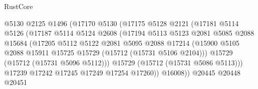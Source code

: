 \begin{lexlean}{RustCore}
\begin{coremodule}
                                    @5130
                                    @2125
                                    @1496
                                    (@17170
                                      @5130
                                      (@17175
                                        @5128
                                        @2121
                                        (@17181
                                          @5114
                                          @5126
                                          (@17187
                                            @5114
                                            @5124
                                            @2608
                                            (@17194
                                              @5113
                                              @5123
                                              @2081
                                              @5085
                                              @2088
                                              @15684
                                              (@17205
                                                @5112
                                                @5122
                                                @2081
                                                @5095
                                                @2088
                                                @17214
                                                (@15900
                                                  @5105
                                                  @2088
                                                  @15911
                                                  @15725
                                                  @15729
                                                  (@15712 (@15731 @5106 @2104)))
                                                @15729
                                                (@15712 (@15731 @5096 @5112)))
                                              @15729
                                              (@15712 (@15731 @5086 @5113)))
                                            @17239
                                            @17242
                                            @17245
                                            @17249
                                            @17254
                                            @17260))
                                        @16008))
                                    @20445
                                    @20448
                                    @20451

\end{coremodule}
\end{lexlean}
